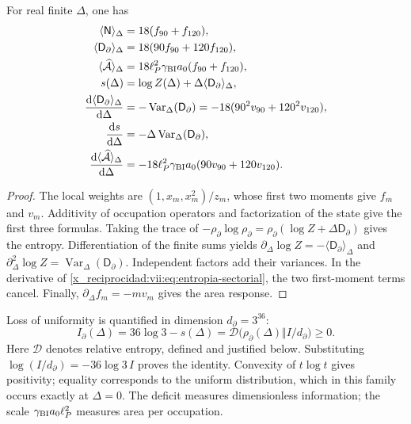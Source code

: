 \begin{proposition}
\label{x_reciprocidad:vii:prop:respuesta-sectorial}
For real finite \(\Delta\), one has
\begin{align}
 \langle\mathsf N\rangle_\Delta&=18(f_{90}+f_{120}),\\
 \langle\mathsf D_\partial\rangle_\Delta&=18(90f_{90}+120f_{120}),\\
 \langle\widehat{\mathcal A}\rangle_\Delta
 &=18\ell_P^2\gamma_{\rm BI}a_0(f_{90}+f_{120}),\\
 s(\Delta)&=\log Z(\Delta)+\Delta\langle\mathsf D_\partial\rangle_\Delta,
 \label{x_reciprocidad:vii:eq:entropia-sectorial}\\
 \frac{\mathrm d\langle\mathsf D_\partial\rangle_\Delta}{\mathrm d\Delta}
 &=-\operatorname{Var}_\Delta(\mathsf D_\partial)
  =-18(90^2v_{90}+120^2v_{120}),\\
 \frac{\mathrm ds}{\mathrm d\Delta}
 &=-\Delta\operatorname{Var}_\Delta(\mathsf D_\partial),\\
 \frac{\mathrm d\langle\widehat{\mathcal A}\rangle_\Delta}{\mathrm d\Delta}
 &=-18\ell_P^2\gamma_{\rm BI}a_0(90v_{90}+120v_{120}).
 \label{x_reciprocidad:vii:eq:respuestas-area-entropia}
\end{align}
\end{proposition}
\begin{proof}
The local weights are \((1,x_m,x_m^2)/z_m\), whose first two
moments give \(f_m\) and \(v_m\). Additivity of occupation
operators and factorization of the state give the first three formulas.
Taking the trace of
\(-\rho_\partial\log\rho_\partial
=\rho_\partial(\log Z+\Delta\mathsf D_\partial)\)
gives the entropy. Differentiation of the finite sums yields
\(\partial_\Delta\log Z=-\langle\mathsf D_\partial\rangle_\Delta\)
and \(\partial_\Delta^2\log Z
=\operatorname{Var}_\Delta(\mathsf D_\partial)\).
Independent factors add their variances. In the derivative of
\eqref{x_reciprocidad:vii:eq:entropia-sectorial}, the two first-moment
terms cancel. Finally, \(\partial_\Delta f_m=-mv_m\)
gives the area response.
\end{proof}

Loss of uniformity is quantified in dimension \(d_\partial=3^{36}\):
\begin{equation}
 I_\partial(\Delta)
 =36\log3-s(\Delta)
 =\mathcal D\bigl(\rho_\partial(\Delta)\Vert I/d_\partial\bigr)\ge0.
 \label{x_reciprocidad:vii:eq:deficit-informacional}
\end{equation}
Here \(\mathcal D\) denotes relative entropy, defined and justified
below. Substituting \(\log(I/d_\partial)=-36\log3\,I\) proves the
identity. Convexity of \(t\log t\) gives positivity; equality
corresponds to the uniform distribution, which in this family occurs
exactly at \(\Delta=0\). The deficit measures dimensionless information;
the scale \(\gamma_{\rm BI}a_0\ell_P^2\) measures area per occupation.

